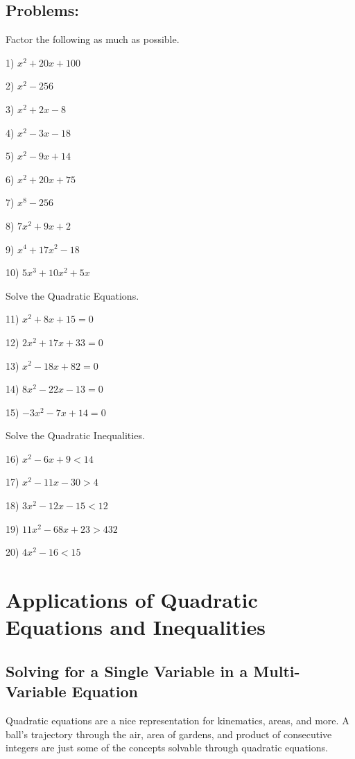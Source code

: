 \documentclass{book}
\theoremstyle{definition}
\begin{document}
					

\subsection{Problems:}

Factor the following as much as possible.
\vspace{3mm}

1) $x^2+20x+100$

2) $x^2-256$

3) $x^2+2x-8$

4) $x^2-3x-18$

5) $x^2-9x+14$

6) $x^2+20x+75$

7) $x^8-256$

8) $7x^2+9x+2$

9) $x^4+17x^2-18$

10) $5x^3+10x^2+5x$

\vspace{3mm}
Solve the Quadratic Equations.
\vspace{3mm}

11) $x^2+8x+15=0$

12) $2x^2+17x+33=0$

13) $x^2-18x+82=0$

14) $8x^2-22x-13=0$

15) $-3x^2-7x+14=0$

\vspace{3mm}
Solve the Quadratic Inequalities.
\vspace{3mm}

16) $x^2-6x+9 < 14$

17) $x^2-11x-30 > 4$

18) $3x^2-12x-15 < 12$

19) $11x^2-68x+23 > 432$

20) $4x^2-16 < 15$

\section{Applications of Quadratic Equations and Inequalities}

\subsection{Solving for a Single Variable in a Multi-Variable Equation}
Quadratic equations are a nice representation for kinematics, areas, and more. A ball’s trajectory through the air, area of gardens, and product of consecutive integers are just some of the concepts solvable through quadratic equations. 
\end{document}
